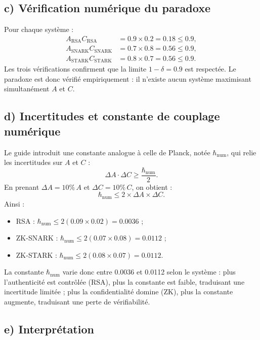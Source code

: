 \documentclass[12pt,a4paper]{report}
\begin{document}
{\subsection*{c) Vérification numérique du paradoxe}

Pour chaque système :
\[
\begin{aligned}
A_{\text{RSA}}C_{\text{RSA}} &= 0.9 \times 0.2 = 0.18 \le 0.9, \\
A_{\text{SNARK}}C_{\text{SNARK}} &= 0.7 \times 0.8 = 0.56 \le 0.9, \\
A_{\text{STARK}}C_{\text{STARK}} &= 0.8 \times 0.7 = 0.56 \le 0.9.
\end{aligned}
\]
Les trois vérifications confirment que la limite $1 - \delta = 0.9$ est respectée.  
Le paradoxe est donc vérifié empiriquement : il n’existe aucun système maximisant simultanément $A$ et $C$.

\subsection*{d) Incertitudes et constante de couplage numérique}

Le guide introduit une constante analogue à celle de Planck, notée $\hbar_{\text{num}}$, qui relie les incertitudes sur $A$ et $C$ :
\[
\Delta A \cdot \Delta C \ge \frac{\hbar_{\text{num}}}{2}.
\]
En prenant $\Delta A = 10\%\,A$ et $\Delta C = 10\%\,C$, on obtient :
\[
\hbar_{\text{num}} \le 2 \times \Delta A \times \Delta C.
\]
Ainsi :
\begin{itemize}
  \item RSA : $\hbar_{\text{num}} \le 2(0.09 \times 0.02) = 0.0036$ ;
  \item ZK-SNARK : $\hbar_{\text{num}} \le 2(0.07 \times 0.08) = 0.0112$ ;
  \item ZK-STARK : $\hbar_{\text{num}} \le 2(0.08 \times 0.07) = 0.0112$.
\end{itemize}

La constante $\hbar_{\text{num}}$ varie donc entre 0.0036 et 0.0112 selon le système :  
plus l’authenticité est contrôlée (RSA), plus la constante est faible, traduisant une incertitude limitée ;  
plus la confidentialité domine (ZK), plus la constante augmente, traduisant une perte de vérifiabilité.

\subsection*{e) Interprétation}

}
\end{document}
